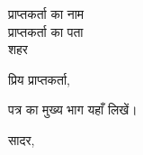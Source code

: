 \documentclass{letter}
\begin{document}
\begin{letter}{प्राप्तकर्ता का नाम \\ प्राप्तकर्ता का पता \\ शहर}
\opening{प्रिय प्राप्तकर्ता,}

पत्र का मुख्य भाग यहाँ लिखें।

\closing{सादर,}

\end{letter}
\end{document}
